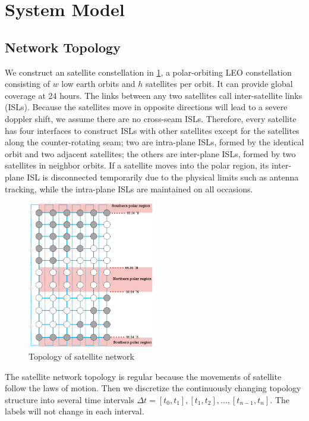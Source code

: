 \section {System Model}
\label{sec:SYS}

\subsection{Network Topology}
We construct an satellite constellation in \ref{fig:TOPOLOGY}, a polar-orbiting LEO constellation consisting of $w$ low earth orbits and $h$ satellites per orbit. It can provide global coverage at 24 hours. The links between any two satellites call inter-satellite links (ISLs). Because the satellites move in opposite directions will lead to a severe doppler shift, we assume there are no cross-seam ISLs. Therefore, every satellite has four interfaces\cite{4ISL} to construct ISLs with other satellites except for the satellites along the counter-rotating seam; two are intra-plane ISLs, formed by the identical orbit and two adjacent satellites; the others are inter-plane ISLs, formed by two satellites in neighbor orbits. If a satellite moves into the polar region, its inter-plane ISL is disconnected temporarily due to the physical limits such as antenna tracking, while the intra-plane ISLs are maintained on all occasions.

\begin{figure}[H]
	\centering
	\includegraphics[scale=0.9,clip, width=0.5\textwidth]{fig/Topology.png}	
	\caption{Topology of satellite network}
	\label{fig:TOPOLOGY}
\end{figure}

The satellite network topology is regular because the movements of satellite follow the laws of motion. Then we discretize the continuously changing topology structure into several time intervals $\Delta t =[t_0, t_1], [t_1, t_2],...,[t_{n-1}, t_n]$. The labels will not change in each interval.

